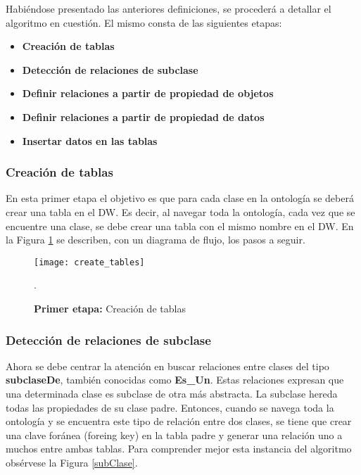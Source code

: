 \documentclass[a4paper,11pt]{article}
\begin{document}
    
    Habiéndose presentado las anteriores definiciones, se procederá a detallar el algoritmo en cuestión. El mismo consta de las siguientes etapas:
    
    \begin{itemize}
      \item \textbf{Creación de tablas}
      \item \textbf{Detección de relaciones de subclase}
      \item \textbf{Definir relaciones a partir de propiedad de objetos}
      \item \textbf{Definir relaciones a partir de propiedad de datos}
      \item \textbf{Insertar datos en las tablas}
    \end{itemize} 
    
    \subsubsection{Creación de tablas}
    
    En esta primer etapa el objetivo es que para cada clase en la ontología se deberá crear una tabla en el DW. Es decir, al navegar toda la ontología,
    cada vez que se encuentre una clase, se debe crear una tabla con el mismo nombre en el DW. En la Figura \ref{createTables} se describen, con un
    diagrama de flujo, los pasos a seguir.
    
    \begin{figure}
      \begin{center}
        \texttt{[image: create\_tables]}
        \caption{\textbf{Primer etapa:} Creación de tablas} \cite[p.~20]{ontologias}.
        \label{createTables}
      \end{center}
    \end{figure}
    
    \subsubsection{Detección de relaciones de subclase}
     
    Ahora se debe centrar la atención en buscar relaciones entre clases del tipo \textbf{subclaseDe}, también conocidas como \textbf{Es\_Un}. Estas
    relaciones expresan que una determinada clase es subclase de otra más abstracta. La subclase hereda todas las propiedades de su clase padre.
    Entonces, cuando se navega toda la ontología y se encuentra este tipo de relación entre dos clases, se tiene que crear una clave foránea (foreing
    key) en la tabla padre y generar una relación uno a muchos entre ambas tablas. Para comprender mejor esta instancia del algoritmo obsérvese la
    Figura \ref{subClase}.
   
\end{document}
